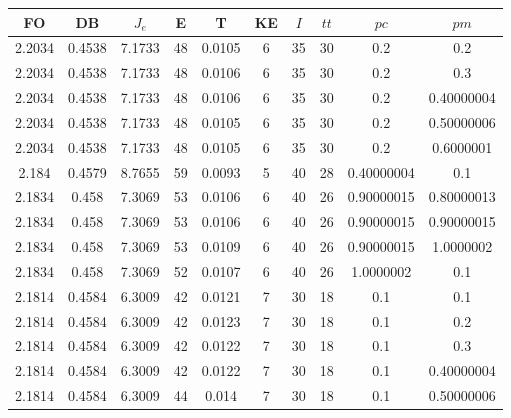 \begin{table}[h!]
    \footnotesize
    \begin{center}
        \begin{tabular}{|c|c|c|c|c|c|c|c|c|c|}
        \hline
            {\bf FO} & {\bf DB} & $J_e$ & {\bf E} & {\bf T} & {\bf KE} & $I$ & $tt$ & $pc$ & $pm$ \\
        \hline
        \hline
            2.2034 & 0.4538  & 7.1733 & 48 & 0.0105 & 6 & 35 & 30 & 0.2 & 0.2\\
        \hline
        \hline
            2.2034 & 0.4538  & 7.1733 & 48 & 0.0106 & 6 & 35 & 30 & 0.2 & 0.3\\
        \hline
        \hline
            2.2034 & 0.4538  & 7.1733 & 48 & 0.0106 & 6 & 35 & 30 & 0.2 & 0.40000004\\
        \hline
        \hline
            2.2034 & 0.4538  & 7.1733 & 48 & 0.0105 & 6 & 35 & 30 & 0.2 & 0.50000006\\
        \hline
        \hline
            2.2034 & 0.4538  & 7.1733 & 48 & 0.0105 & 6 & 35 & 30 & 0.2 & 0.6000001\\
        \hline
        \hline
            2.184 & 0.4579  & 8.7655 & 59 & 0.0093 & 5 & 40 & 28 & 0.40000004 & 0.1\\
        \hline
        \hline
            2.1834 & 0.458  & 7.3069 & 53 & 0.0106 & 6 & 40 & 26 & 0.90000015 & 0.80000013\\
        \hline
        \hline
            2.1834 & 0.458  & 7.3069 & 53 & 0.0106 & 6 & 40 & 26 & 0.90000015 & 0.90000015\\
        \hline
        \hline
            2.1834 & 0.458  & 7.3069 & 53 & 0.0109 & 6 & 40 & 26 & 0.90000015 & 1.0000002\\
        \hline
        \hline
            2.1834 & 0.458  & 7.3069 & 52 & 0.0107 & 6 & 40 & 26 & 1.0000002 & 0.1\\
        \hline
        \hline
            2.1814 & 0.4584  & 6.3009 & 42 & 0.0121 & 7 & 30 & 18 & 0.1 & 0.1\\
        \hline
        \hline
            2.1814 & 0.4584  & 6.3009 & 42 & 0.0123 & 7 & 30 & 18 & 0.1 & 0.2\\
        \hline
        \hline
            2.1814 & 0.4584  & 6.3009 & 42 & 0.0122 & 7 & 30 & 18 & 0.1 & 0.3\\
        \hline
        \hline
            2.1814 & 0.4584  & 6.3009 & 42 & 0.0122 & 7 & 30 & 18 & 0.1 & 0.40000004\\
        \hline
        \hline
            2.1814 & 0.4584  & 6.3009 & 44 & 0.014 & 7 & 30 & 18 & 0.1 & 0.50000006\\

\end{tabular}
\end{center}
\end{table}
